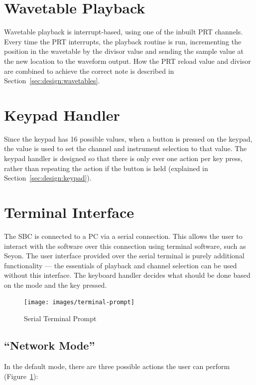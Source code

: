\section{Wavetable Playback}
\label{sec:overview:playback}

Wavetable playback is interrupt-based, using one of the inbuilt PRT channels.  Every time the PRT 
interrupts, the playback routine is run, incrementing the position in the wavetable by the divisor 
value and sending the sample value at the new location to the waveform output.  How the PRT reload 
value and divisor are combined to achieve the correct note is described in 
Section~\ref{sec:design:wavetables}.

\section{Keypad Handler}
\label{sec:overview:keypad}

Since the keypad has 16 possible values, when a button is pressed on the keypad, the value is used 
to set the channel and instrument selection to that value.  The keypad handler is designed so that 
there is only ever one action per key press, rather than repeating the action if the button is held 
(explained in Section~\ref{sec:design:keypad}).

\section{Terminal Interface}
\label{sec:overview:terminal}

The SBC is connected to a PC via a serial connection.  This allows the user to interact with the 
software over this connection using terminal software, such as Seyon.  The user interface provided 
over the serial terminal is purely additional functionality --- the essentials of playback and 
channel selection can be used without this interface.  The keyboard handler decides what should be 
done based on the mode and the key pressed.

\begin{figure}[htb]
\centering
\texttt{[image: images/terminal-prompt]}
\caption{Serial Terminal Prompt}\label{fig:terminal-prompt}
\end{figure}

\subsection{``Network Mode''}

In the default mode, there are three possible actions the user can perform 
(Figure~\ref{fig:terminal-prompt}):

